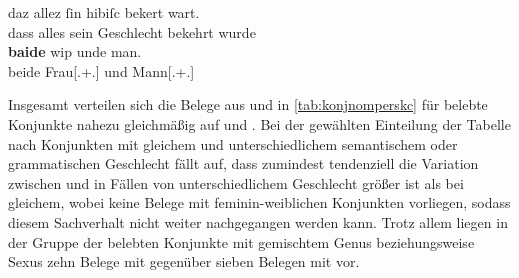 \begin{exe}
\ex \label{ex:beideundegnrc}
	\gll daz allez ſin hibiſc bekert wart. \\
		dass alles sein Geschlecht bekehrt wurde \\
\sn \gll \textbf{baide} wip unde man. \\
		beide Frau[\Nom.\Sg+\Pl.\NeutF] und Mann[\Nom.\Sg+\Pl.\MascM] \\
	\begin{taggedline}{\parencites[\pno~27\va, 9--11]{kc:A1}[6360--6361]{schroeder1895}}
	\trans {}
	\end{taggedline}
\end{exe}

Insgesamt verteilen sich die Belege aus \citet{kc:A1} und \citet{kc:VB} in
\cref{tab:konjnomperskc} für belebte Konjunkte nahezu gleichmäßig auf
 und . Bei der gewählten Einteilung der Tabelle nach
Konjunkten mit gleichem und unterschiedlichem semantischem oder grammatischen
Geschlecht fällt auf, dass zumindest tendenziell die Variation zwischen
 und  in Fällen von unterschiedlichem Geschlecht größer ist
als bei gleichem, wobei keine Belege mit feminin-weiblichen Konjunkten
vorliegen, sodass diesem Sachverhalt nicht weiter nachgegangen werden kann.
Trotz allem liegen in der Gruppe der belebten Konjunkte mit gemischtem Genus
beziehungsweise Sexus zehn Belege mit  gegenüber sieben Belegen
mit  vor.

